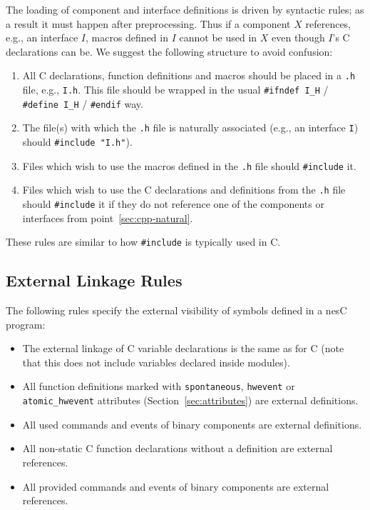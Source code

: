 \documentclass[11pt,letterpaper]{article}
\newcommand{\code}[1]{{\tt #1}}
\newcommand{\file}[1]{{\tt #1}}
\begin{document}
The loading of component and interface definitions is driven by syntactic
rules; as a result it must happen after preprocessing. Thus if a component
$X$ references, e.g., an interface $I$, macros defined in $I$ cannot be
used in $X$ even though $I$'s C declarations can be. We suggest the
following structure to avoid confusion:
\begin{enumerate}
\item All C declarations, function definitions and macros should be placed
in a \file{.h} file, e.g., \file{I.h}. This file should be wrapped in the
usual \code{\#ifndef I\_H} / \code{\#define I\_H} / \code{\#endif} way.

\item The file(s) with which the \file{.h} file is naturally associated
(e.g., an interface \code{I}) should \code{\#include "I.h"}).
\label{sec:cpp-natural}

\item Files which wish to use the macros defined in the \file{.h} file
should \code{\#include} it.

\item Files which wish to use the C declarations and definitions from
the \file{.h} file should \code{\#include} it if they do not reference one
of the components or interfaces from point~\ref{sec:cpp-natural}.
\end{enumerate}

These rules are similar to how \code{\#include} is typically used in C.

\subsection{External Linkage Rules}
\label{sec:linkage}

The following rules specify the external visibility of symbols defined
in a nesC program:
\begin{itemize}
\item The external linkage of C variable declarations is the same as for C
(note that this does not include variables declared inside modules).

\item All function definitions marked with \code{spontaneous},
\code{hwevent} or \code{atomic\_hwevent} attributes
(Section~\ref{sec:attributes}) are external definitions.

\item All used commands and events of binary components are external
definitions.

\item All non-static C function declarations without a definition
are external references.

\item All provided commands and events of binary components are
external references.
\end{itemize}
\end{document}
